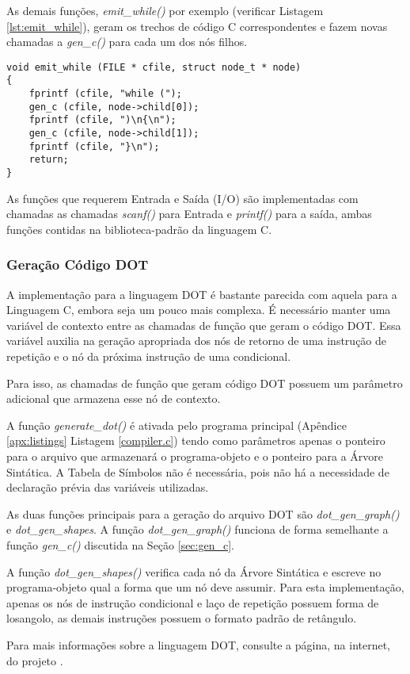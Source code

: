 As demais funções, \emph{emit\_while()} por exemplo (verificar Listagem
\ref{lst:emit_while}), geram os trechos de código C correspondentes e fazem novas
chamadas a \emph{gen\_c()} para cada um dos nós filhos.

\begin{lstlisting}[label=lst:emit_while,caption=Função geradora do comando
while em C]
void emit_while (FILE * cfile, struct node_t * node)
{
	fprintf (cfile, "while (");
	gen_c (cfile, node->child[0]);
	fprintf (cfile, ")\n{\n");
	gen_c (cfile, node->child[1]);
	fprintf (cfile, "}\n");
	return;
}
\end{lstlisting}

As funções que requerem Entrada e Saída (I/O) são implementadas com chamadas
as chamadas \emph{scanf()} para Entrada e \emph{printf()} para a saída, ambas
funções contidas na biblioteca-padrão da linguagem C.

\subsubsection{Geração Código DOT}
\label{sec:gen_dot}

A implementação para a linguagem DOT é bastante parecida com aquela para a
Linguagem C, embora seja um pouco mais complexa. É necessário manter uma
variável de contexto entre as chamadas de função que geram o código DOT.
Essa variável auxilia na geração apropriada dos nós de retorno de uma
instrução de repetição e o nó da próxima instrução de uma condicional.

Para isso, as chamadas de função que geram código DOT possuem um parâmetro
adicional que armazena esse nó de contexto.

A função \emph{generate\_dot()} é ativada pelo programa principal
(Apêndice \ref{apx:listings} Listagem \ref{compiler.c}) tendo como parâmetros
apenas o ponteiro para o arquivo que armazenará o programa-objeto e o ponteiro
para a Árvore Sintática. A Tabela de Símbolos não é necessária, pois não há a
necessidade de declaração prévia das variáveis utilizadas.

As duas funções principais para a geração do arquivo DOT são
\emph{dot\_gen\_graph()} e \emph{dot\_gen\_shapes}. A função
\emph{dot\_gen\_graph()} funciona de forma semelhante a função
\emph{gen\_c()} discutida na Seção \ref{sec:gen_c}.

A função \emph{dot\_gen\_shapes()} verifica cada nó da Árvore Sintática e
escreve no programa-objeto qual a forma que um nó deve assumir. Para esta
implementação, apenas os nós de instrução condicional e laço de repetição
possuem forma de losangolo, as demais instruções possuem o formato padrão de
retângulo.

Para mais informações sobre a linguagem DOT, consulte a página, na internet, do
projeto .

